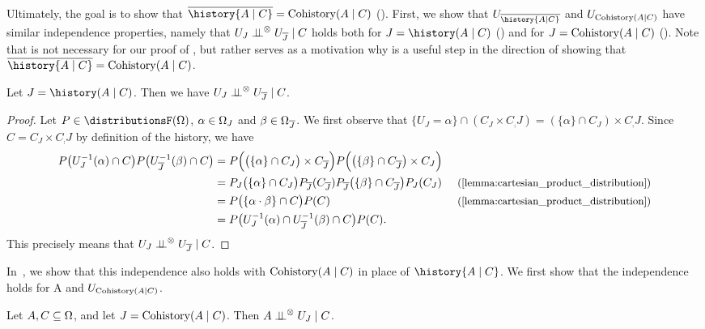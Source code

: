 \documentclass[USenglish,onecolumn]{article}
\begin{document}
Ultimately, the goal is to show that $\comp{\history{A \given C}} = \historyC(A \given C)$ ().
First, we show that $U_\comp{\history{A \given C}}$ and $U_{\operatorname{Cohistory}(A \mid C)}$ have similar independence properties, namely that $U_{J} \mathrel{\perp\!\!\!\perp}^\otimes U_{{\overline{J}}} \mid C$ holds both for $J=\history(A\given C)$ () and for $J=\operatorname{Cohistory}(A\mid C)$ (). Note that  is not necessary for our proof of , but rather serves as a motivation why  is a useful step in the direction of showing that $\comp{\history{A \given C}} = \historyC(A \given C)$.
\begin{lemma}
    \label{lemma:similar_indep_properties}
Let $J = \history(A \given C)$.
Then we have $U_{J} \mathrel{\perp\!\!\!\perp}^\otimes U_{{\overline{J}}} \mid C$.
\end{lemma}
\begin{proof}
    Let $P \in \distributionsF(\Omg)$, $\alpha \in \Omega_J$ and $\beta \in \Omega_{{\overline{J}}}$. We first observe that $\{U_J = \alpha\}\cap (C_J\times C_\comp{J})=(\{\alpha\}\cap C_J)\times C_\comp{J}$. Since $C=C_J\times C_\comp{J}$ by definition of the history, we have
\begin{align*}
  P\big( U_J^{-1}(\x) \cap C \big)  P\big( U_{\comp{J}}^{-1}(\y) \cap C \big) &=
  P\Big( \big(\{\x\} \cap C_J\big) \times C_{\comp{J}} \Big)
  P\Big( \big( \{\y\} \cap C_{\comp{J}} \big) \times C_{J} \Big) \\
  &= P_J\big( \{\x\} \cap C_J \big)  P_{\comp{J}}(C_{\comp{J}})P_{\comp{J}}\big( \{\y\} \cap C_{\comp{J}} \big)  P_J(C_J) &\text{\small(\Cref{lemma:cartesian_product_distribution})}\\
  &= P\big( \{\x \cdot \y\} \cap C \big)  P(C) &\text{\small(\Cref{lemma:cartesian_product_distribution})}\\
  &= P\big( U_J^{-1}(\x) \cap U_{\comp{J}}^{-1}(\y) \cap C \big)  P(C).
\end{align*}
This precisely means that $U_{J} \mathrel{\perp\!\!\!\perp}^\otimes U_{{\overline{J}}} \mid C$.
\end{proof}
In~, we show that this independence also holds with $\operatorname{Cohistory}(A \mid C)$ in place of $\history{A \given C}$.
We first show that the independence holds for A and $U_{\operatorname{Cohistory}(A \mid C)}$.

\begin{lemma}
  \label{lemma:intermediate_independence_claim}
  Let $A, C \subseteq \Omega$, and let $J = \operatorname{Cohistory}(A \mid C)$.
  Then $A \mathrel{\perp\!\!\!\perp}^\otimes U_J \mid C$.
\end{lemma}
\end{document}
